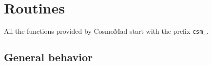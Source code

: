 \documentclass[a4paper,10pt]{article}
\begin{document}


\section{Routines}

All the functions provided by CosmoMad start with the prefix {\tt csm\_}.

\subsection{General behavior}
\end{document}
